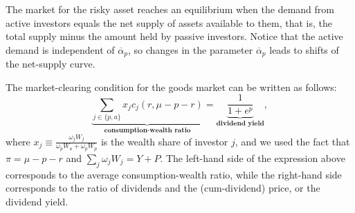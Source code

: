 The market for the risky asset reaches an equilibrium when the demand from active investors equals the net supply of assets available to them, that is, the total supply minus the amount held by passive investors. 
Notice that the active demand is independent of $\overline{\alpha}_p$, so changes in the parameter $\overline{\alpha}_p$ leads to shifts of the net-supply curve. 


The market-clearing condition for the goods market can be written as follows:
\begin{equation}\label{eq:consumption_mkt_clearing1}
   \underbrace{ \sum_{j\in\{p,a\}} x_j c_j(r, \mu-p-r)}_{\textbf{consumption-wealth ratio}} = \underbrace{\frac{1}{1+e^p}}_{\textbf{dividend yield}},
\end{equation}
where $x_j \equiv \frac{\omega_j W_j}{\omega_p W_a + \omega_p W_p}$ is the wealth share of investor $j$, and we used the fact that $\pi = \mu - p-r$ and $\sum_{j}\omega_j W_j = Y + P$. 
The left-hand side of the expression above corresponds to the average consumption-wealth ratio, while the right-hand side corresponds to the ratio of dividends and the (cum-dividend) price, or the dividend yield. 


